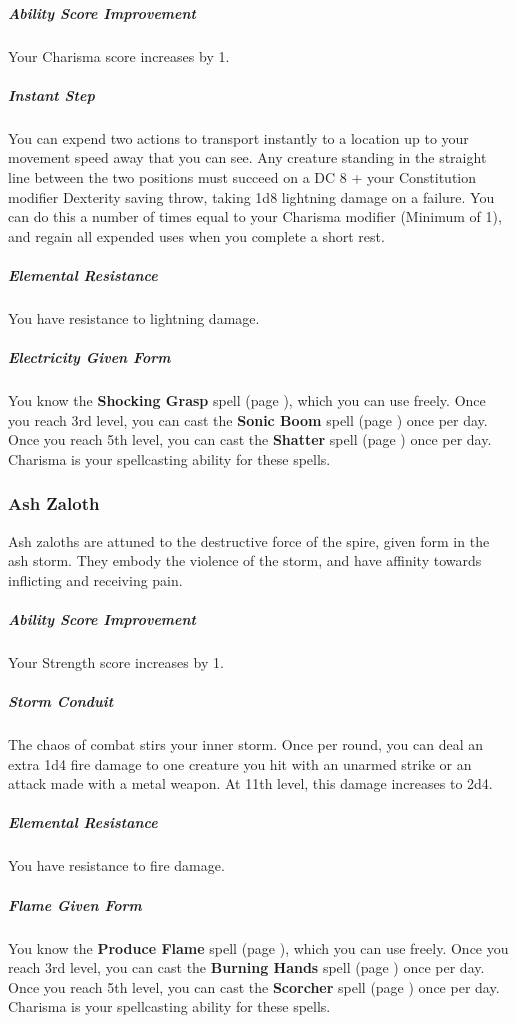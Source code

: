     \subparagraph{Ability Score Improvement}
        Your Charisma score increases by 1.

    \subparagraph{Instant Step}
        You can expend two actions to transport instantly to a location up to your movement speed away that you can see.
        Any creature standing in the straight line between the two positions must succeed on a DC 8 + your Constitution modifier Dexterity saving throw, taking 1d8 lightning damage on a failure.
        You can do this a number of times equal to your Charisma modifier (Minimum of 1), and regain all expended uses when you complete a short rest.

    \subparagraph{Elemental Resistance}
        You have resistance to lightning damage.

    \subparagraph{Electricity Given Form}
        You know the \textbf{Shocking Grasp} spell (page \pageref{spell::shockinggrasp}), which you can use freely.
        Once you reach 3rd level, you can cast the \textbf{Sonic Boom} spell (page \pageref{spell::sonicboom}) once per day.
        Once you reach 5th level, you can cast the \textbf{Shatter} spell (page \pageref{spell::shatter}) once per day.
        Charisma is your spellcasting ability for these spells.

\subsubsection{Ash Zaloth}
    Ash zaloths are attuned to the destructive force of the spire, given form in the ash storm.
    They embody the violence of the storm, and have affinity towards inflicting and receiving pain.

    \subparagraph{Ability Score Improvement}
        Your Strength score increases by 1.

    \subparagraph{Storm Conduit}
        The chaos of combat stirs your inner storm.
        Once per round, you can deal an extra 1d4 fire damage to one creature you hit with an unarmed strike or an attack made with a metal weapon.
        At 11th level, this damage increases to 2d4.

    \subparagraph{Elemental Resistance}
        You have resistance to fire damage.

    \subparagraph{Flame Given Form}
        You know the \textbf{Produce Flame} spell (page \pageref{spell::produceflame}), which you can use freely.
        Once you reach 3rd level, you can cast the \textbf{Burning Hands} spell (page \pageref{spell::burninghands}) once per day.
        Once you reach 5th level, you can cast the \textbf{Scorcher} spell (page \pageref{spell::scorcher}) once per day.
        Charisma is your spellcasting ability for these spells.

